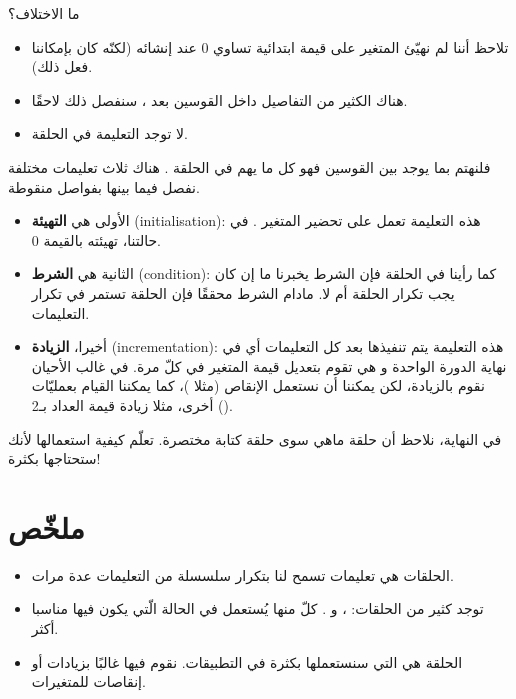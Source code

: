ما الاختلاف؟

\begin{itemize}
	\item تلاحظ أننا لم نهيّئ المتغير 
	على قيمة ابتدائية تساوي 0 عند إنشائه (لكنّه كان بإمكاننا فعل ذلك).
	\item هناك الكثير من التفاصيل داخل القوسين بعد 
	،
	سنفصل ذلك لاحقًا.
	\item لا توجد التعليمة 
	في الحلقة.
\end{itemize}

فلنهتم بما يوجد بين القوسين فهو كل ما يهم في الحلقة 
.
هناك ثلاث تعليمات مختلفة نفصل فيما بينها بفواصل منقوطة.

\begin{itemize}
	\item الأولى هي
	\textbf{التهيئة}
	(\textenglish{initialisation}):
	هذه التعليمة تعمل على تحضير المتغير
	.
	في حالتنا، تهيئته بالقيمة 0.
	\item الثانية هي
	\textbf{الشرط}
	(\textenglish{condition}):
	كما رأينا في الحلقة 
	فإن الشرط يخبرنا ما إن كان يجب تكرار الحلقة أم لا. مادام الشرط محققًا فإن الحلقة تستمر في تكرار التعليمات.
	\item أخيرا،
	\textbf{الزيادة}
	(\textenglish{incrementation}):
	هذه التعليمة يتم تنفيذها بعد كل التعليمات أي في نهاية الدورة الواحدة و هي تقوم بتعديل قيمة المتغير 
	في كلّ مرة. في غالب الأحيان نقوم بالزيادة، لكن يمكننا أن نستعمل الإنقاص (مثلا 
	)،
	كما يمكننا القيام بعمليّات أخرى، مثلا زيادة قيمة العداد بـ2
	().
\end{itemize}

في النهاية، نلاحظ أن حلقة
ماهي سوى حلقة كتابة مختصرة. تعلّم كيفية استعمالها لأنك ستحتاجها بكثرة!

\section*{ملخّص}

\begin{itemize}
	\item الحلقات هي تعليمات تسمح لنا بتكرار سلسسلة من التعليمات عدة مرات.
	\item توجد كثير من الحلقات:
	،
	و 
	.
	كلّ منها  يُستعمل في الحالة الّتي يكون فيها مناسبا أكثر.
	\item الحلقة
	هي التي سنستعملها بكثرة في التطبيقات. نقوم فيها غالبًا بزيادات أو إنقاصات للمتغيرات.
\end{itemize}
